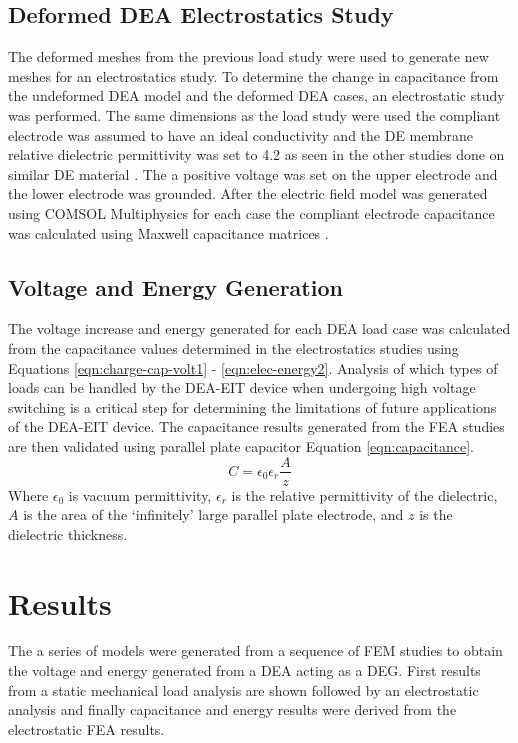 \subsection{Deformed DEA Electrostatics Study}
The deformed meshes from the previous load study were used to generate new meshes for an electrostatics study. To determine the change in capacitance from the undeformed DEA model and the deformed DEA cases, an electrostatic study was performed. The same dimensions as the load study were used the compliant electrode was assumed to have an ideal conductivity and the DE membrane relative dielectric permittivity was set to 4.2 as seen in the other studies done on similar DE material \cite{Pan2015}. The a positive voltage was set on the upper electrode and the lower electrode was grounded. After the electric field model was generated using COMSOL Multiphysics \cite{COMSOL2022} for each case the compliant electrode capacitance was calculated using Maxwell capacitance matrices \cite{Smolic2021} . 


\subsection{Voltage and Energy Generation}
The voltage increase and energy generated for each DEA load case was calculated from the capacitance values determined in the electrostatics studies using Equations \ref{eqn:charge-cap-volt1} - \ref{eqn:elec-energy2}. Analysis of which types of loads can be handled by the DEA-EIT device when undergoing high voltage switching is a critical step for determining the limitations of future applications of the DEA-EIT device. The capacitance results generated from the FEA studies are then validated using parallel plate capacitor Equation \ref{eqn:capacitance}.
\begin{equation}
	C = \epsilon_0 \epsilon_r \frac{A}{z}
	\label{eqn:capacitance}
\end{equation}
Where $\epsilon_0$ is vacuum permittivity, $\epsilon_r$ is the relative permittivity of the dielectric, $A$ is the area of the `infinitely' large parallel plate electrode, and $z$ is the dielectric thickness.


\section{Results}
\label{sec:results}
The a series of models were generated from a sequence of FEM studies to obtain the voltage and energy generated from a DEA acting as a DEG. First results from a static mechanical load analysis are shown followed by an electrostatic analysis and finally capacitance and energy results were derived from the electrostatic FEA results.


